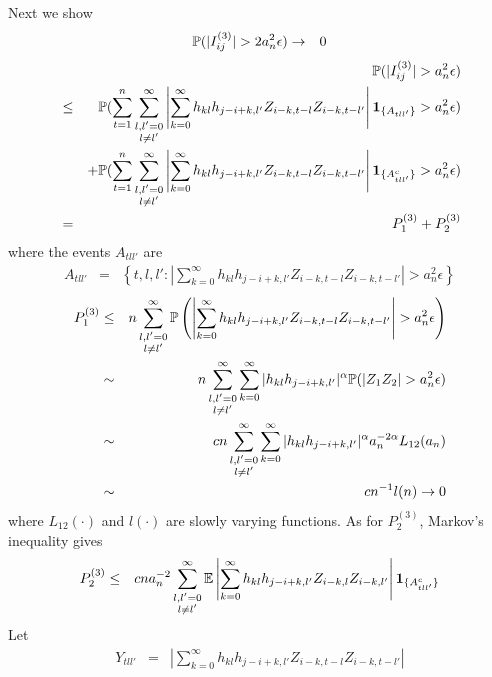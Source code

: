 \documentclass{article}
\begin{document}
Next we show
\begin{eqnarray*}
  \mathbb{P}(|I^{(3)}_{ij}| > 2 a_n^2 \epsilon) &\to& 0
\end{eqnarray*}
\begin{eqnarray*}
  && \mathbb{P}(|I^{(3)}_{ij}| > a_n^2 \epsilon) \\
  &\leq& \mathbb{P}(\sum_{t=1}^n \sum_{\substack{l,l'=0 \\ l \neq l'}}^\infty
  \left|\sum_{k=0}^\infty h_{kl}h_{j-i+k,l'} Z_{i-k,t-l}Z_{i-k,t-l'}\right|
  \mathbf{1}_{\{A_{tll'}\}} > a_n^2 \epsilon ) \\
  && + \mathbb{P}(\sum_{t=1}^n \sum_{\substack{l,l'=0 \\ l \neq l'}}^\infty
  \left|\sum_{k=0}^\infty h_{kl}h_{j-i+k,l'} Z_{i-k,t-l}Z_{i-k,t-l'}\right|
  \mathbf{1}_{\{A^c_{tll'}\}} > a_n^2 \epsilon ) \\
  &=& P^{(3)}_1 + P^{(3)}_2
\end{eqnarray*}
where the events $A_{tll'}$ are
\begin{eqnarray*}
  A_{tll'} &=& \left\{t,l,l': \left|
      \sum_{k=0}^\infty h_{kl}h_{j-i+k,l'} Z_{i-k,t-l}Z_{i-k,t-l'}
    \right| > a_n^2 \epsilon \right\}
\end{eqnarray*}
\begin{eqnarray*}
  P^{(3)}_1 &\leq& n \sum_{\substack{l,l'=0 \\ l \neq l'}}^\infty \mathbb{P}\left(
    \left|\sum_{k=0}^\infty h_{kl}h_{j-i+k,l'} Z_{i-k,t-l}Z_{i-k,t-l'}\right| > a_n^2 \epsilon
  \right) \\
  &\sim& n \sum_{\substack{l,l'=0 \\ l \neq l'}}^\infty \sum_{k=0}^\infty |h_{kl}h_{j-i+k,l'}|^{\alpha} \mathbb{P}(|Z_1 Z_2| > a_n^2 \epsilon)
  \\
  &\sim& c n \sum_{\substack{l,l'=0 \\ l \neq l'}}^\infty
  \sum_{k=0}^\infty |h_{kl}h_{j-i+k,l'}|^{\alpha} a_n^{-2\alpha} L_{12}(a_n)\\  
  &\sim& c n^{-1} l(n)  \to 0
\end{eqnarray*}
where $L_{12}(\cdot)$ and $l(\cdot)$ are slowly varying functions. As
for $P^{(3)}_2$, Markov's inequality gives
\begin{eqnarray*}
  P^{(3)}_2 &\leq& c n a_n^{-2} \sum_{\substack{l,l'=0 \\ l \neq l'}}^\infty
  \mathbb{E}\left|\sum_{k=0}^\infty h_{kl}h_{j-i+k,l'}
    Z_{i-k,l}Z_{i-k,l'}\right| \mathbf{1}_{\{A^c_{tll'}\}} \\
\end{eqnarray*}
Let
\begin{eqnarray*}
  Y_{tll'} &=& \left|\sum_{k=0}^\infty h_{kl}h_{j-i+k,l'}
              Z_{i-k,t-l}Z_{i-k,t-l'}\right|
\end{eqnarray*}
\end{document}
